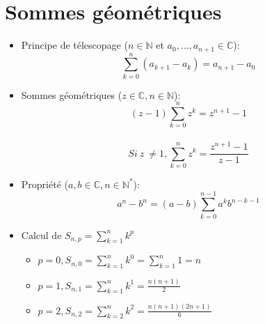 \documentclass{article}
\begin{document}
\section{Sommes g\'{e}om\'{e}triques} 
\begin{itemize}
	\item Principe de t\'{e}lescopage (\(n \in \mathbb{N}\) et \(a_0, \hdots, a_{n+1} \in \mathbb{C}\)): \\
	\[\sum_{k=0}^{n} (a_{k+1} - a_k) = a_{n+1} - a_0\]
	\item Sommes g\'{e}om\'{e}triques (\(z \in \mathbb{C}, n \in \mathbb{N}\)):
	\[(z-1)\sum_{k=0}^{n}z^k = z^{n+1} -1\] \\
	\[Si\ z\ \neq 1, \sum_{k=0}^{n}z^k=\frac{z^{n+1}-1}{z-1}\]
	\item Propri\'{e}t\'{e} (\(a,b \in \mathbb{C}, n \in \mathbb{N}^*\)): \\
	\[a^n-b^n = (a-b)\sum_{k=0}^{n-1}a^kb^{n-k-1}\]
	\item Calcul de \(S_{n,p} = \sum_{k=1}^{n}k^p\) \\
	\begin{itemize}
		\item \(p = 0, S_{n,0} = \sum_{k=1}^{n}k^0 = \sum_{k=1}^{n}1 = n\) \\
		\item \(p = 1, S_{n,1} = \sum_{k=1}^{n}k^1 = \frac{n(n+1)}{2} \) \\
		\item \(p = 2, S_{n,2} = \sum_{k=2}^{n}k^2 = \frac{n(n+1)(2n+1)}{6} \) \\
	\end{itemize}


\end{itemize}
\end{document}
